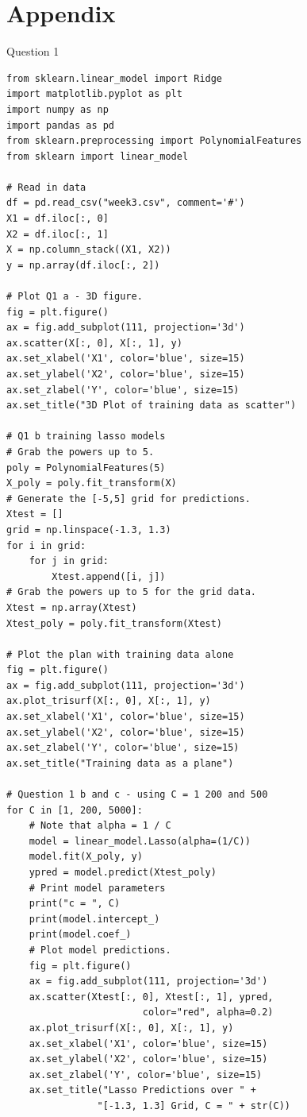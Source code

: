 \documentclass[10pt]{article}
\begin{document}
\section*{Appendix}
Question 1
\begin{lstlisting}
from sklearn.linear_model import Ridge
import matplotlib.pyplot as plt
import numpy as np
import pandas as pd
from sklearn.preprocessing import PolynomialFeatures
from sklearn import linear_model

# Read in data
df = pd.read_csv("week3.csv", comment='#')
X1 = df.iloc[:, 0]
X2 = df.iloc[:, 1]
X = np.column_stack((X1, X2))
y = np.array(df.iloc[:, 2])

# Plot Q1 a - 3D figure.
fig = plt.figure()
ax = fig.add_subplot(111, projection='3d')
ax.scatter(X[:, 0], X[:, 1], y)
ax.set_xlabel('X1', color='blue', size=15)
ax.set_ylabel('X2', color='blue', size=15)
ax.set_zlabel('Y', color='blue', size=15)
ax.set_title("3D Plot of training data as scatter")

# Q1 b training lasso models
# Grab the powers up to 5.
poly = PolynomialFeatures(5)
X_poly = poly.fit_transform(X)
# Generate the [-5,5] grid for predictions.
Xtest = []
grid = np.linspace(-1.3, 1.3)
for i in grid:
    for j in grid:
        Xtest.append([i, j])
# Grab the powers up to 5 for the grid data.
Xtest = np.array(Xtest)
Xtest_poly = poly.fit_transform(Xtest)

# Plot the plan with training data alone
fig = plt.figure()
ax = fig.add_subplot(111, projection='3d')
ax.plot_trisurf(X[:, 0], X[:, 1], y)
ax.set_xlabel('X1', color='blue', size=15)
ax.set_ylabel('X2', color='blue', size=15)
ax.set_zlabel('Y', color='blue', size=15)
ax.set_title("Training data as a plane")

# Question 1 b and c - using C = 1 200 and 500
for C in [1, 200, 5000]:
    # Note that alpha = 1 / C
    model = linear_model.Lasso(alpha=(1/C))
    model.fit(X_poly, y)
    ypred = model.predict(Xtest_poly)
    # Print model parameters
    print("c = ", C)
    print(model.intercept_)
    print(model.coef_)
    # Plot model predictions.
    fig = plt.figure()
    ax = fig.add_subplot(111, projection='3d')
    ax.scatter(Xtest[:, 0], Xtest[:, 1], ypred,
                        color="red", alpha=0.2)
    ax.plot_trisurf(X[:, 0], X[:, 1], y)
    ax.set_xlabel('X1', color='blue', size=15)
    ax.set_ylabel('X2', color='blue', size=15)
    ax.set_zlabel('Y', color='blue', size=15)
    ax.set_title("Lasso Predictions over " +
                "[-1.3, 1.3] Grid, C = " + str(C))


\end{lstlisting}
\end{document}
